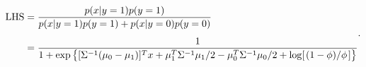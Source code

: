 \begin{answer}
	\[
		\begin{aligned}
			\mathrm{LHS}
			&=
			\frac{p(x|y=1)p(y=1)}
			{p(x|y=1)p(y=1)+p(x|y=0)p(y=0)}
			\\[5pt]&=
			\frac{1}
			{1+\exp\qty{[\Sigma^{-1}(\mu_0-\mu_1)]^Tx+\mu_1^T\Sigma^{-1}\mu_1/2-\mu_0^T\Sigma^{-1}\mu_0/2+\log[\flatfrac{(1-\phi)}{\phi}]}}
		\end{aligned}
	.\] 
\end{answer}
